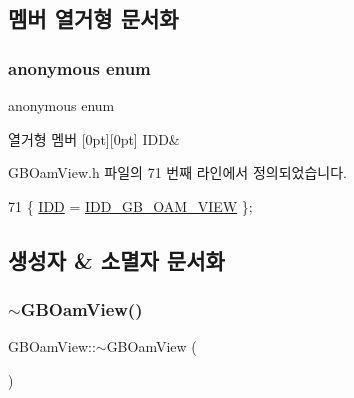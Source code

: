 \subsection{멤버 열거형 문서화}
\mbox{\label{class_g_b_oam_view_a5c41d4094ee7a3c5fc13c3e57414e350}} 
\subsubsection{\texorpdfstring{anonymous enum}{anonymous enum}}
{\footnotesize\ttfamily anonymous enum}

\begin{DoxyEnumFields}{열거형 멤버}
[0pt][0pt]{}\mbox{\label{class_g_b_oam_view_a5c41d4094ee7a3c5fc13c3e57414e350ae84ca5a6130d1f054bb8372fc76c89c9}} 
I\+DD&\\
\hline

\end{DoxyEnumFields}


G\+B\+Oam\+View.\+h 파일의 71 번째 라인에서 정의되었습니다.


\begin{DoxyCode}
71 \{ \mbox{\hyperlink{class_g_b_oam_view_a5c41d4094ee7a3c5fc13c3e57414e350ae84ca5a6130d1f054bb8372fc76c89c9}{IDD}} = \mbox{\hyperlink{resource_8h_a4181bac198f45f438568253af0ce927b}{IDD\_GB\_OAM\_VIEW}} \};
\end{DoxyCode}


\subsection{생성자 \& 소멸자 문서화}
\mbox{\label{class_g_b_oam_view_afb55eb0347b0ba6460217f261489596a}} 
\subsubsection{\texorpdfstring{$\sim$\+G\+B\+Oam\+View()}{~GBOamView()}}
{\footnotesize\ttfamily G\+B\+Oam\+View\+::$\sim$\+G\+B\+Oam\+View (\begin{DoxyParamCaption}{ }\end{DoxyParamCaption})}



